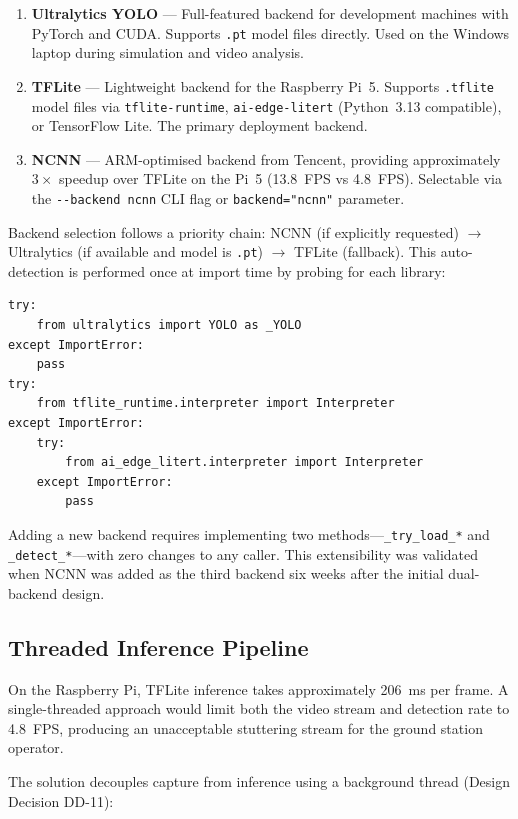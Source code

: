 \begin{enumerate}
    \item \textbf{Ultralytics YOLO} --- Full-featured backend for development machines
          with PyTorch and CUDA. Supports \texttt{.pt} model files directly. Used on
          the Windows laptop during simulation and video analysis.
    \item \textbf{TFLite} --- Lightweight backend for the Raspberry Pi~5.
          Supports \texttt{.tflite} model files via \texttt{tflite-runtime},
          \texttt{ai-edge-litert} (Python~3.13 compatible), or TensorFlow Lite.
          The primary deployment backend.
    \item \textbf{NCNN} --- ARM-optimised backend from Tencent, providing approximately
          $3\times$ speedup over TFLite on the Pi~5 (13.8~FPS vs 4.8~FPS). Selectable
          via the \texttt{-{}-backend ncnn} CLI flag or \texttt{backend="ncnn"} parameter.
\end{enumerate}

Backend selection follows a priority chain: NCNN (if explicitly requested) $\rightarrow$
Ultralytics (if available and model is \texttt{.pt}) $\rightarrow$ TFLite (fallback).
This auto-detection is performed once at import time by probing for each library:

\begin{verbatim}
try:
    from ultralytics import YOLO as _YOLO
except ImportError:
    pass
try:
    from tflite_runtime.interpreter import Interpreter
except ImportError:
    try:
        from ai_edge_litert.interpreter import Interpreter
    except ImportError:
        pass
\end{verbatim}

Adding a new backend requires implementing two methods---\texttt{\_try\_load\_*} and
\texttt{\_detect\_*}---with zero changes to any caller. This extensibility was validated
when NCNN was added as the third backend six weeks after the initial dual-backend design.

\subsection{Threaded Inference Pipeline}

On the Raspberry Pi, TFLite inference takes approximately 206~ms per frame. A
single-threaded approach would limit both the video stream and detection rate to
4.8~FPS, producing an unacceptable stuttering stream for the ground station operator.

The solution decouples capture from inference using a background thread
(Design Decision DD-11):

